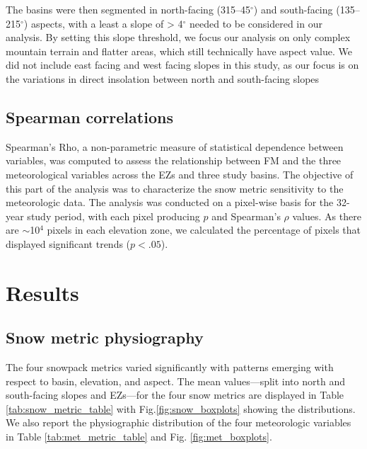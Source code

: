 The basins were then segmented in north-facing (315--45$^{\circ}$) and south-facing (135--215$^{\circ}$) aspects, with a least a slope of > 4$^{\circ}$ needed to be considered in our analysis. By setting this slope threshold, we focus our analysis on only complex mountain terrain and flatter areas, which still technically have aspect value. We did not include east facing and west facing slopes in this study, as our focus is on the variations in direct insolation between north and south-facing slopes

\hypertarget{ch2-methods-3}{\subsection{Spearman correlations}\label{ch2-methods-3}}

Spearman's Rho, a non-parametric measure of statistical dependence between variables, was computed to assess the relationship between FM and the three meteorological variables across the EZs and three study basins. The objective of this part of the analysis was to characterize the snow metric sensitivity to the meteorologic data. The analysis was conducted on a pixel-wise basis for the 32-year study period, with each pixel producing $p$ and Spearman's $\rho$ values. As there are $\sim$10$^4$ pixels in each elevation zone, we calculated the percentage of pixels that displayed significant trends ($p < .05$).

\hypertarget{ch2-results}{\section{Results}\label{ch2-results}}
\hypertarget{ch2-results-1}{\subsection{Snow metric physiography}\label{ch2-results-1}}

The four snowpack metrics varied significantly with patterns emerging with respect to basin, elevation, and aspect. The mean values---split into north and south-facing slopes and EZs---for the four snow metrics are displayed in Table \ref{tab:snow_metric_table} with Fig.\ref{fig:snow_boxplots} showing the distributions. We also report the physiographic distribution of the four meteorologic variables in Table \ref{tab:met_metric_table} and Fig. \ref{fig:met_boxplots}.

